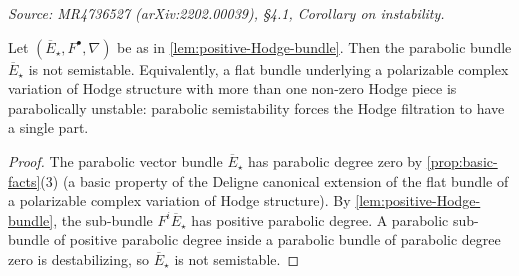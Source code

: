 \begin{corollary}
  \label{cor:unstable}
  \textit{Source: MR4736527 (arXiv:2202.00039), §4.1, Corollary on instability.}

  Let \((\overline{E}_\star, F^\bullet, \nabla)\) be as in
  \cref{lem:positive-Hodge-bundle}. Then the parabolic bundle
  \(\overline{E}_\star\) is not semistable. Equivalently, a flat bundle underlying
  a polarizable complex variation of Hodge structure with more than one non-zero
  Hodge piece is parabolically unstable: parabolic semistability forces the Hodge
  filtration to have a single part.
\end{corollary}

\begin{proof}
  The parabolic vector bundle \(\overline{E}_\star\) has parabolic degree zero by
  \cref{prop:basic-facts}(3) (a basic property of the Deligne canonical extension
  of the flat bundle of a polarizable complex variation of Hodge structure). By
  \cref{lem:positive-Hodge-bundle}, the sub-bundle \(F^i \overline{E}_\star\) has
  positive parabolic degree. A parabolic sub-bundle of positive parabolic degree
  inside a parabolic bundle of parabolic degree zero is destabilizing, so
  \(\overline{E}_\star\) is not semistable.
\end{proof}
